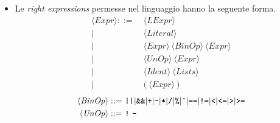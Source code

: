 \documentclass[11pt,a4paper,italian]{article}
\newcommand{\token}[1]{\langle \mathit{#1} \rangle }
\begin{document}
\begin{itemize}
	\item Le \emph{right expressions} permesse nel linguaggio hanno la seguente forma.
	\begin{align*}
	\token{Expr} ::=\ &\token{LExpr}\\
	|\ &\token{Literal}\\
	|\ &\token{Expr}\ \token{BinOp}\ \token{Expr}\\
	|\ &\token{UnOp}\ \token{Expr}\\
	|\ &\token{Ident}\ \token{Lists}\\
	|\ &\texttt{(}\ \token{Expr}\ \texttt{)}
	\end{align*}
	\begin{align*}
	\token{BinOp} ::=\ &\texttt{||} | \texttt{\&\&}|\texttt{+}|\texttt{-}|\texttt{*}|\texttt{/}|\texttt{\%}|\texttt{\^{}}|\texttt{==}|\texttt{!=}|\texttt{<}|\texttt{<=}|\texttt{>}|\texttt{>=}\\
	\token{UnOp} ::=\ &\texttt{!}\ \texttt{-}
	\end{align*}

	
	\end{itemize}
	
\end{document}
